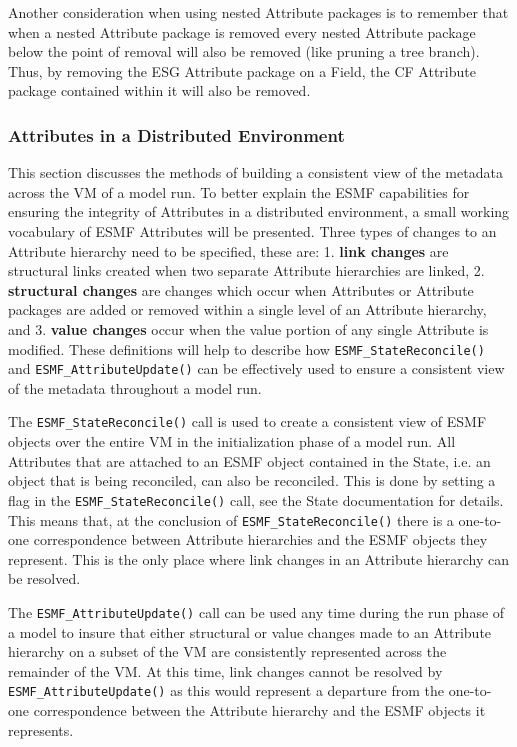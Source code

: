 Another consideration when using nested Attribute packages is to remember that when a nested Attribute package is removed every nested Attribute package below the point of removal will also be removed (like pruning a tree branch).  Thus, by removing the ESG Attribute package on a Field, the CF Attribute package contained within it will also be removed.

\subsubsection{Attributes in a Distributed Environment}
\label{sec:Att:Dist}

This section discusses the methods of building a consistent view of the metadata across the VM of a model run.  To better explain the ESMF capabilities for ensuring the integrity of Attributes in a distributed environment, a small working vocabulary of ESMF Attributes will be presented.  Three types of changes to an Attribute hierarchy need to be specified, these are: 1. {\bf link changes} are structural links created when two separate Attribute hierarchies are linked, 2. {\bf structural changes} are changes which occur when Attributes or Attribute packages are added or removed within a single level of an Attribute hierarchy, and 3. {\bf value changes} occur when the value portion of any single Attribute is modified.  These definitions will help to describe how {\tt ESMF\_StateReconcile()} and {\tt ESMF\_AttributeUpdate()} can be effectively used to ensure a consistent view of the metadata throughout a model run.

The {\tt ESMF\_StateReconcile()} call is used to create a consistent view of ESMF objects over the entire VM in the initialization phase of a model run.  All Attributes that are attached to an ESMF object contained in the State, i.e. an object that is being reconciled, can also be reconciled.  This is done by setting a flag in the {\tt ESMF\_StateReconcile()} call, see the State documentation for details.  This means that, at the conclusion of {\tt ESMF\_StateReconcile()} there is a one-to-one correspondence between Attribute hierarchies and the ESMF objects they represent.  This is the only place where link changes in an Attribute hierarchy can be resolved.

The {\tt ESMF\_AttributeUpdate()} call can be used any time during the run phase of a model to insure that either structural or value changes made to an Attribute hierarchy on a subset of the VM are consistently represented across the remainder of the VM.  At this time, link changes cannot be resolved by {\tt ESMF\_AttributeUpdate()} as this would represent a departure from the one-to-one correspondence between the Attribute hierarchy and the ESMF objects it represents.  

